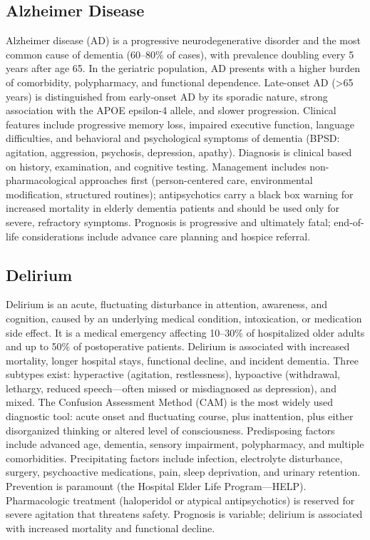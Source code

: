 \subsection{Alzheimer Disease}
\label{sec:Alzheimer Disease}
Alzheimer disease (AD) is a progressive neurodegenerative disorder and the most common cause of dementia (60--80\% of cases), with prevalence doubling every 5 years after age 65. In the geriatric population, AD presents with a higher burden of comorbidity, polypharmacy, and functional dependence. Late-onset AD (>65 years) is distinguished from early-onset AD by its sporadic nature, strong association with the APOE epsilon-4 allele, and slower progression. Clinical features include progressive memory loss, impaired executive function, language difficulties, and behavioral and psychological symptoms of dementia (BPSD: agitation, aggression, psychosis, depression, apathy). Diagnosis is clinical based on history, examination, and cognitive testing. Management includes non-pharmacological approaches first (person-centered care, environmental modification, structured routines); antipsychotics carry a black box warning for increased mortality in elderly dementia patients and should be used only for severe, refractory symptoms. Prognosis is progressive and ultimately fatal; end-of-life considerations include advance care planning and hospice referral.

\subsection{Delirium}
\label{sec:Delirium}

Delirium is an acute, fluctuating disturbance in attention, awareness, and cognition, caused by an underlying medical condition, intoxication, or medication side effect. It is a medical emergency affecting 10--30\% of hospitalized older adults and up to 50\% of postoperative patients. Delirium is associated with increased mortality, longer hospital stays, functional decline, and incident dementia. Three subtypes exist: hyperactive (agitation, restlessness), hypoactive (withdrawal, lethargy, reduced speech---often missed or misdiagnosed as depression), and mixed. The Confusion Assessment Method (CAM) is the most widely used diagnostic tool: acute onset and fluctuating course, plus inattention, plus either disorganized thinking or altered level of consciousness. Predisposing factors include advanced age, dementia, sensory impairment, polypharmacy, and multiple comorbidities. Precipitating factors include infection, electrolyte disturbance, surgery, psychoactive medications, pain, sleep deprivation, and urinary retention. Prevention is paramount (the Hospital Elder Life Program---HELP). Pharmacologic treatment (haloperidol or atypical antipsychotics) is reserved for severe agitation that threatens safety. Prognosis is variable; delirium is associated with increased mortality and functional decline.

